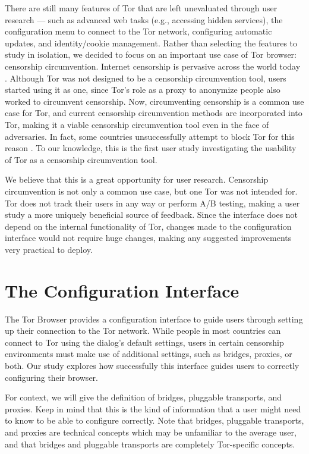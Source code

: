 \documentclass{template}
\begin{document}
There are still many features of Tor that are left unevaluated through user
research --- such as advanced web tasks (e.g., accessing hidden services), the
configuration menu to connect to the Tor network, configuring automatic
updates, and identity/cookie management. Rather than selecting the features to
study in isolation, we decided to focus on an important use case of Tor browser: censorship circumvention. 
Internet censorship is pervasive across the world today \cite{faris2008measuring}. 
Although Tor was not designed to be a censorship circumvention tool, users started
using it as one, since Tor's role as a proxy to anonymize
people also worked to circumvent censorship. Now, circumventing censorship is a
common use case for Tor, and current censorship circumvention methods are
incorporated into Tor, making it a viable censorship circumvention tool even in the face
of adversaries. In fact, some countries unsuccessfully attempt to block Tor for this reason \cite{winter2012great}. 
To our knowledge, this is the first user study investigating the usability of Tor as a 
censorship circumvention tool.

We believe that this is a great opportunity for user research. Censorship circumvention
is not only a common use case, but one Tor was not intended for. Tor does not
track their users in any way or perform A/B testing, making a user study a more
uniquely beneficial source of feedback. Since the interface does not depend on the 
internal functionality of Tor, changes made to the configuration interface would not
require huge changes, making any suggested improvements very practical to 
deploy. 

\section{The Configuration Interface}

The Tor Browser provides a configuration interface to guide users through setting up 
their connection to the
Tor network. While people in most countries can connect to Tor using the
dialog's default settings, users in certain censorship environments must
make use of additional settings, such as bridges, proxies, or both. 
Our study explores how successfully this interface guides users to
correctly configuring their browser.

For context, we will give the definition of bridges, pluggable transports, and proxies. 
Keep in mind that this is the kind of information that a user might need to know to be able
to configure correctly. Note that bridges, pluggable transports, and proxies are technical 
concepts which may be unfamiliar to the average user, and that bridges and pluggable
transports are completely Tor-specific concepts. 
\end{document}
